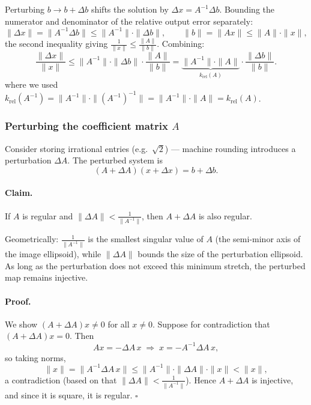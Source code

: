 \documentclass{article}
\begin{document}
Perturbing $b \to b + \Delta b$ shifts the solution by $\Delta x = A^{-1}\Delta b$.
Bounding the numerator and denominator of the relative output error separately:
\[
  \|\Delta x\| = \|A^{-1}\Delta b\| \leq \|A^{-1}\|\cdot\|\Delta b\|,
  \qquad
  \|b\| = \|Ax\| \leq \|A\|\cdot\|x\|,
\]
the second inequality giving $\tfrac{1}{\|x\|} \leq \tfrac{\|A\|}{\|b\|}$.
Combining:
\[
  \frac{\|\Delta x\|}{\|x\|} \leq \|A^{-1}\|\cdot\|\Delta b\|\cdot\frac{\|A\|}{\|b\|}
  = \underbrace{\|A^{-1}\|\cdot\|A\|}_{k_{\mathrm{rel}}(A)}\cdot\frac{\|\Delta b\|}{\|b\|}.
\]
where we used $k_{\mathrm{rel}}(A^{-1}) = \|A^{-1}\|\cdot\|(A^{-1})^{-1}\|
= \|A^{-1}\|\cdot\|A\| = k_{\mathrm{rel}}(A)$.

\subsubsection{Perturbing the coefficient matrix $A$}

Consider storing irrational entries (e.g.\ $\sqrt{2}$) --- machine rounding
introduces a perturbation $\Delta A$.  The perturbed system is
\[
  (A + \Delta A)(x + \Delta x) = b + \Delta b.
\]

\paragraph{Claim.}
If $A$ is regular and $\|\Delta A\| < \tfrac{1}{\|A^{-1}\|}$,
then $A + \Delta A$ is also regular.

Geometrically: $\tfrac{1}{\|A^{-1}\|}$ is the smallest singular value of $A$
(the semi-minor axis of the image ellipsoid), while $\|\Delta A\|$ bounds the
size of the perturbation ellipsoid.  As long as the perturbation does not
exceed this minimum stretch, the perturbed map remains injective.

\paragraph{Proof.}
We show $(A + \Delta A)x \neq 0$ for all $x \neq 0$.
Suppose for contradiction that $(A + \Delta A)x = 0$.  Then
\[
  Ax = -\Delta A\,x
  \;\Longrightarrow\;
  x = -A^{-1}\Delta A\,x,
\]
so taking norms,
\[
  \|x\| = \|A^{-1}\Delta A\,x\|
        \leq \|A^{-1}\|\cdot\|\Delta A\|\cdot\|x\|
        < \|x\|,
\]
a contradiction (based on that $\| \Delta A\| < \frac{1}{\| A^{-1}\|}$).  Hence $A + \Delta A$ is injective, and since it is square,
it is regular. $\square$
\end{document}
